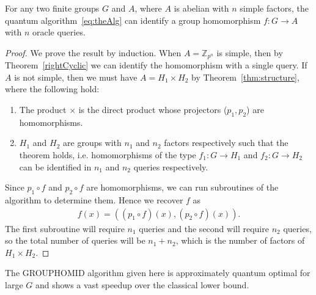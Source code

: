 \begin{theorem}\label{thm:intoAbThm}
For any two finite groups $G$ and $A$, where $A$ is abelian with $n$ simple factors, the quantum algorithm~\eqref{eq:theAlg} can identify a group homomorphism $f:G \to A$ with $n$ oracle queries.
\end{theorem}
\begin{proof}
We prove the result by induction. 
\newline\newline
{} When $A=\mathbb{Z}_{p^n}$ is simple, then by Theorem~\ref{rightCyclic} we can identify the homomorphism with a single query.
\newline\newline
{} If $A$ is not simple, then we must have $A=H_1\times H_2$ by Theorem~\ref{thm:structure}, where the following hold:
\begin{enumerate}

\item The product $\times$ is the direct product whose projectors ($p_1,p_2$) are homomorphisms.

\item  $H_1$ and $H_2$ are groups with $n_1$ and $n_2$ factors respectively such  that the theorem holds, i.e. homomorphisms of the type $f_{1}:G\to H_1$ and $f_{2}:G\to H_2$  can be identified in $n_1$ and $n_2$ queries respectively.

\end{enumerate} 
Since $p_1\circ f$ and $p_2\circ f$ are homomorphisms, we can run subroutines of the algorithm to determine them. Hence we recover $f$ as
\begin{align*}
f(x) = ( (p_1\circ f)(x),(p_2\circ f)(x) ).
\end{align*}
The first subroutine will require $n_1$ queries and the second will require $n_2$ queries, so the total number of queries will be $n_1+n_2$, which is the number of factors of $H_1\times H_2$.
\end{proof}


The GROUPHOMID algorithm given here is approximately quantum optimal for large $G$ and shows a vast speedup over the classical lower bound.

